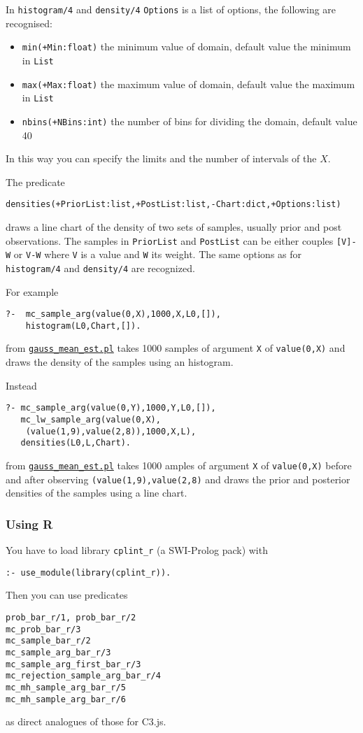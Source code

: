 In  \verb|histogram/4| and  \verb|density/4| \verb|Options| is a list of options, the following are recognised: \begin{itemize}
\item \verb|min(+Min:float)|
the minimum value of domain, default value the minimum in \verb|List|
\item \verb|max(+Max:float)|
the maximum value of domain, default value the maximum in  \verb|List|
\item \verb|nbins(+NBins:int)|
  the number of bins for dividing the domain, default value 40
\end{itemize}
In this way you can specify the limits and the number of intervals of the $X$.


The predicate
\begin{verbatim}
densities(+PriorList:list,+PostList:list,-Chart:dict,+Options:list)
\end{verbatim}
draws a line chart of the density of two sets of samples, usually
 prior and post observations. The samples in \verb|PriorList| and \verb|PostList|
can be either couples \verb|[V]-W| or \verb|V-W| where \verb|V| is a value and \verb|W| its weight.
The same options as for \verb|histogram/4| and  \verb|density/4|  are recognized.

For example
\begin{verbatim}
?-  mc_sample_arg(value(0,X),1000,X,L0,[]),
    histogram(L0,Chart,[]).
\end{verbatim}
from \href{http://cplint.eu/example/inference/gauss_mean_est.pl}{\texttt{gauss\_mean\_est.pl}}
takes 1000 samples of argument \verb|X| of \verb|value(0,X)| and draws the density of the samples using an histogram.

Instead
\begin{verbatim}
?- mc_sample_arg(value(0,Y),1000,Y,L0,[]),
   mc_lw_sample_arg(value(0,X),
    (value(1,9),value(2,8)),1000,X,L),
   densities(L0,L,Chart).
\end{verbatim}
from \href{http://cplint.eu/example/inference/gauss_mean_est.pl}{\texttt{gauss\_mean\_est.pl}}
takes 1000 amples of argument \verb|X| of \verb|value(0,X)| before and after observing
\verb|(value(1,9),value(2,8)| and draws the prior and posterior densities of the samples using a line chart.

\subsubsection{Using R}
You have to load library \texttt{cplint\_r}  (a SWI-Prolog pack) with
\begin{verbatim}
:- use_module(library(cplint_r)).
\end{verbatim}
Then you can use predicates
\begin{verbatim}
prob_bar_r/1, prob_bar_r/2
mc_prob_bar_r/3
mc_sample_bar_r/2
mc_sample_arg_bar_r/3
mc_sample_arg_first_bar_r/3
mc_rejection_sample_arg_bar_r/4
mc_mh_sample_arg_bar_r/5
mc_mh_sample_arg_bar_r/6
\end{verbatim}
as direct analogues of those for C3.js.

